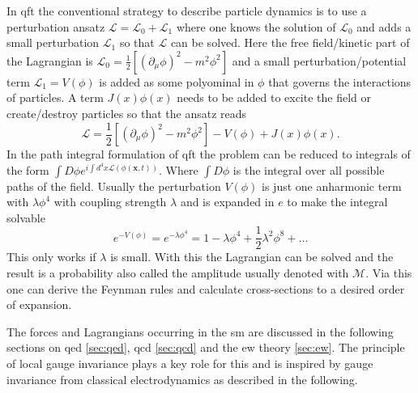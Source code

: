 In \ac{qft} the conventional strategy to describe particle dynamics is to use a perturbation ansatz $\mathcal{L}=\mathcal{L}_0+\mathcal{L}_1$ where one knows the solution of $\mathcal{L}_0$ and adds a small perturbation $\mathcal{L}_1$ so that $\mathcal{L}$ can be solved. Here the free field/kinetic part of the Lagrangian is \mbox{$\mathcal{L}_0=\frac{1}{2}[(\partial_\mu \phi)^2 - m^2\phi^2] $} and a small perturbation/potential term $\mathcal{L}_1=V(\phi)$ is added as some polyominal in $\phi$ that governs the interactions of particles. A term $J(x)\phi(x)$ needs to be added to excite the field or create/destroy particles so that the ansatz reads
\begin{equation}
    \mathcal{L}=\frac{1}{2}[(\partial_\mu \phi)^2 - m^2\phi^2]
    -V(\phi) + J(x)\phi(x).
\end{equation}
In the path integral formulation of \ac{qft} the problem can be reduced to integrals of the form \mbox{$\int D\phi e^{i\int d^4x \mathcal{L}(\phi(\bm{x},t))}$}. Where $\int D\phi$ is the integral over all possible paths of the field. Usually the perturbation $V(\phi)$ is just one anharmonic term with $\lambda\phi^4$ with coupling strength $\lambda$ and is expanded in $e$ to make the integral solvable
\begin{equation}
    e^{-V(\phi)}=e^{-\lambda\phi^4}=1-\lambda\phi^4+\frac{1}{2}\lambda^2\phi^8+\dots
\end{equation}
This only works if $\lambda$ is small. With this the Lagrangian can be solved and the result is a probability also called the amplitude usually denoted with $\mathcal{M}$. Via this one can derive the Feynman rules and calculate cross-sections to a desired order of expansion.

The forces and Lagrangians occurring in the \ac{sm} are discussed in the following sections on \ac{qed} \ref{sec:qed}, \ac{qcd} \ref{sec:qcd} and the \ac{ew} theory \ref{sec:ew}. The principle of local gauge invariance plays a key role for this and is inspired by gauge invariance from classical electrodynamics as described in the following.

